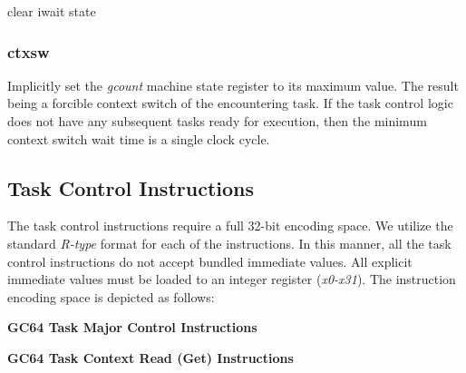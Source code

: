 \documentclass{article}
\begin{document}
\begin{algorithm}[H]
 clear iwait state
\end{algorithm}

\subsubsection{ctxsw}

Implicitly set the \emph{gcount} machine state register
to its maximum value.  The result being a forcible context
switch of the encountering task.  If the task control logic
does not have any subsequent tasks ready for execution, then the
minimum context switch wait time is a single clock cycle.  

\subsection{Task Control Instructions}

The task control instructions require a full 32-bit encoding space.  We utilize
the standard \emph{R-type} format for each of the instructions.  In this manner, 
all the task control instructions do not accept bundled immediate values.  All 
explicit immediate values must be loaded to an integer register (\emph{x0-x31}).
The instruction encoding space is depicted as follows: 

\begin{center}
\textbf{GC64 Task Major Control Instructions}
\makebox[0.03in][s]{}\makebox[0.03in][s]{}\makebox[0.03in][s]{}\makebox[0.03in][s]{}\makebox[0.03in][s]{}
\end{center}

\begin{center}
\textbf{GC64 Task Context Read (Get) Instructions}
\makebox[0.03in][s]{}\makebox[0.03in][s]{}\makebox[0.03in][s]{}\makebox[0.03in][s]{}\makebox[0.03in][s]{}
\end{center}
\end{document}
